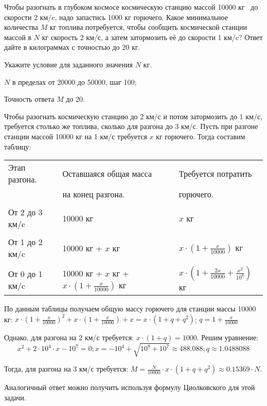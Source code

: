 
Чтобы разогнать в глубоком космосе
космическую станцию массой 10000 кг  до скорости
2 км/c, надо запастись 1000 кг горючего. Какое минимальное количества \linebreak $M$ кг топлива потребуется,
чтобы сообщить космической станции массой в $N$ кг скорость 2 км/с, 
а затем затормозить её до скорости 1 км/c? Ответ дайте в килограммах с точностью до 20 кг.

Укажите условие для заданного значения $N$ кг.

\paramSection

$N$ в пределах от 20000 до 50000, шаг 100;         

Точность ответа $M$  до  20.
\solutionSection

Чтобы разогнать космическую станцию до 2 км/с и потом затормозить до 1 км/с, требуется столько же топлива, 
сколько для разгона до 3 км/с. Пусть при разгоне станции массой 10000 кг  на 1 км/с требуется $x$ кг горючего. 
Тогда составим таблицу:
\begin{tabular}{l l l}
    Этап разгона. &	Оставшаяся общая масса  &	Требуется потратить \\
    & на конец разгона. & горючего.\\
    & & \\
    От 2 до 3 км/c & 	10000 кг  &  	$x$ кг\\
    & & \\
    От  1 до 2 км/c & 	10000 кг  + $x$ кг	 & $x \cdot \left( 1 + \frac{x}{10000}\right)$  кг\\
    & & \\
    От 0 до 1 км/c & 	10000 кг  + $x$ кг + $x \cdot \left( 1 + \frac{x}{10000}\right)$  кг	 & $x \cdot \left( 1 + \frac{2x}{10000} + \frac{x^2}{10^8}\right)$   кг\\
\end{tabular}

По данным таблицы получаем общую массу горючего для станции \linebreak массы 10000 кг:
$x \cdot \left( 1 + \frac{x}{10000}\right)^2+x \cdot \left( 1 +\frac{x}{10000}\right)+x=x  \cdot (1+q+q^2 )$;  
$q=1 +\frac{x}{10000}$ 

Однако, для разгона на 2 км/с требуется: $x  \cdot (1+q)=1000 $. Решим уравнение:
$$x^2+2 \cdot 10^4 \cdot x-10^7=0; x= -10^4+\sqrt{10^8+10^7}  \approx 488.088; q\approx 1.0488088 $$

Тогда, для разгона на 3 км/с требуется: $M=\frac{N}{10000} \cdot x \cdot (1+q+q^2 )\approx 0.15369 \cdot N.$

Аналогичный ответ можно получить используя формулу Циолковского для этой задачи.

